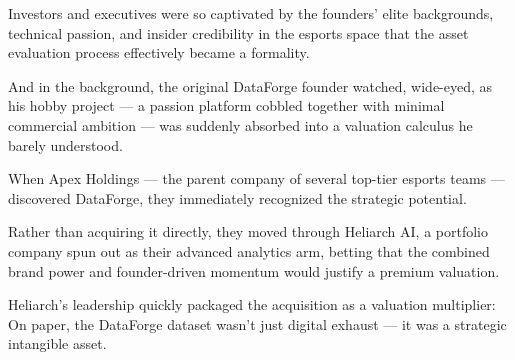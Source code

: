 Investors and executives were so captivated by the founders’ elite backgrounds, technical passion, and insider credibility in the esports space that the asset evaluation process effectively became a formality.

And in the background, the original DataForge founder watched, wide-eyed, as his hobby project --- a passion platform cobbled together with minimal commercial ambition --- was suddenly absorbed into a valuation calculus he barely understood.

When Apex Holdings --- the parent company of several top-tier esports teams --- discovered DataForge, they immediately recognized the strategic potential.

Rather than acquiring it directly, they moved through Heliarch AI, a portfolio company spun out as their advanced analytics arm, betting that the combined brand power and founder-driven momentum would justify a premium valuation.

Heliarch’s leadership quickly packaged the acquisition as a valuation multiplier: On paper, the DataForge dataset wasn’t just digital exhaust --- it was a strategic intangible asset.

